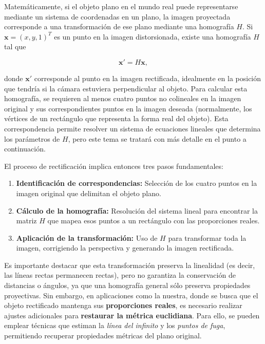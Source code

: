 Matemáticamente, si el objeto plano en el mundo real puede representarse mediante un sistema de coordenadas en un plano, la imagen proyectada corresponde a una transformación de ese plano mediante una homografía \(H\). Si \( \mathbf{x} = (x, y, 1)^T \) es un punto en la imagen distorsionada, existe una homografía \(H\) tal que

\begin{equation}
    \mathbf{x}' = H \mathbf{x},
\end{equation}


donde \(\mathbf{x}'\) corresponde al punto en la imagen rectificada, idealmente en la posición que tendría si la cámara estuviera perpendicular al objeto. Para calcular esta homografía, se requieren al menos cuatro puntos no colineales en la imagen original y sus correspondientes puntos en la imagen deseada (normalmente, los vértices de un rectángulo que representa la forma real del objeto). Esta correspondencia permite resolver un sistema de ecuaciones lineales que determina los parámetros de \(H\), pero este tema se tratará con más detalle en el punto a continuación.

El proceso de rectificación implica entonces tres pasos fundamentales:

\begin{enumerate}
  \item \textbf{Identificación de correspondencias:} Selección de los cuatro puntos en la imagen original que delimitan el objeto plano.
  \item \textbf{Cálculo de la homografía:} Resolución del sistema lineal para encontrar la matriz \(H\) que mapea esos puntos a un rectángulo con las proporciones reales.
  \item \textbf{Aplicación de la transformación:} Uso de \(H\) para transformar toda la imagen, corrigiendo la perspectiva y generando la imagen rectificada.
\end{enumerate}

Es importante destacar que esta transformación preserva la linealidad (es decir, las líneas rectas permanecen rectas), pero no garantiza la conservación de distancias o ángulos, ya que una homografía general sólo preserva propiedades proyectivas. Sin embargo, en aplicaciones como la nuestra, donde se busca que el objeto rectificado mantenga sus \textbf{proporciones reales}, es necesario realizar ajustes adicionales para \textbf{restaurar la métrica euclidiana}. Para ello, se pueden emplear técnicas que estiman la \textit{línea del infinito} y los \textit{puntos de fuga}, permitiendo recuperar propiedades métricas del plano original.

